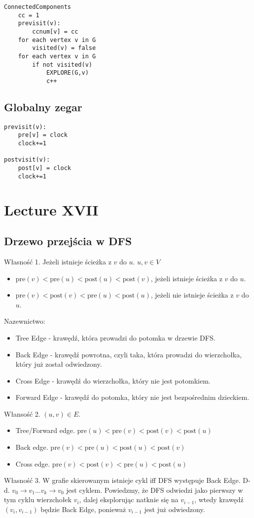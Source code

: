 \documentclass{article}
\numberwithin{equation}{subsection}
\begin{document}
\begin{verbatim}
ConnectedComponents
    cc = 1
    previsit(v):
        ccnum[v] = cc
    for each vertex v in G
        visited(v) = false
    for each vertex v in G
        if not visited(v)  
            EXPLORE(G,v)
            c++
\end{verbatim}

\subsection{Globalny zegar}

\begin{verbatim}
previsit(v):
    pre[v] = clock
    clock+=1

postvisit(v):
    post[v] = clock
    clock+=1
\end{verbatim}

\section{Lecture XVII}

\subsection{Drzewo przejścia w DFS}

Własność 1. Jeżeli istnieje ścieżka z $v$ do $u$. $u,v \in V$
\begin{itemize}
    \item $\text{pre}(v) < \text{pre}(u) < \text{post}(u) < \text{post}(v)$, jeżeli istnieje ścieżka z $v$ do $u$.
    \item $\text{pre}(v) < \text{post}(v) < \text{pre}(u) < \text{post}(u)$, jeżeli nie istnieje ścieżka z $v$ do $u$.
\end{itemize}
Nazewnictwo:
\begin{itemize}
    \item Tree Edge - krawędź, która prowadzi do potomka w drzewie DFS.
    \item Back Edge - krawędź powrotna, czyli taka, która prowadzi do wierzchołka, który już został odwiedzony.
    \item Cross Edge - krawędź do wierzchołka, który nie jest potomkiem.
    \item Forward Edge - krawędź do potomka, który nie jest bezpośrednim dzieckiem.
\end{itemize}
Włansość 2. $(u,v)\in E$.
\begin{itemize}
    \item Tree/Forward edge. $\text{pre}(u) < \text{pre}(v) < \text{post}(v) < \text{post}(u)$
    \item Back edge. $\text{pre}(v) < \text{pre}(u) < \text{post}(u) < \text{post}(v)$
    \item Cross edge. $\text{pre}(v) < \text{post}(v) < \text{pre}(u) < \text{post}(u)$
\end{itemize}
Własność 3. W grafie skierowanym istnieje cykl iff DFS występuje Back Edge.
D-d. $v_0\rightarrow v_1 \dots v_k\rightarrow v_0$ jest cyklem.
Powiedzmy, że DFS odwiedzi jako pierwszy w tym cyklu wierzchołek $v_i$, dalej eksplorując natknie się na $v_{i-1}$,
wtedy krawędź $(v_i,v_{i-1})$ będzie Back Edge, ponieważ $v_{i-1}$ jest już odwiedzony.
\end{document}
